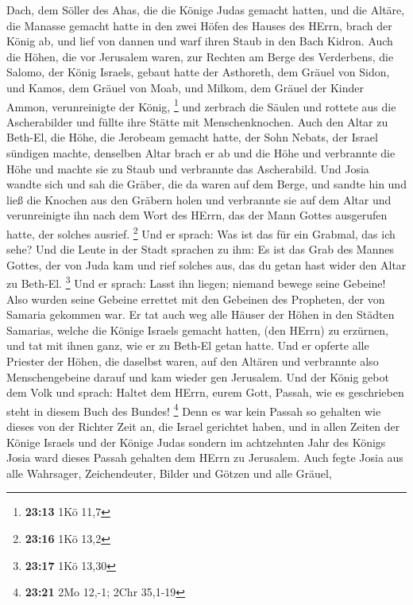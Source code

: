 Dach, dem Söller des Ahas, die die Könige Judas gemacht hatten, und die
Altäre, die Manasse gemacht hatte in den zwei Höfen des Hauses des
HErrn, brach der König ab, und lief von dannen und warf ihren Staub in
den Bach Kidron.  Auch die Höhen, die vor Jerusalem waren,
zur Rechten am Berge des Verderbens, die Salomo, der König Israels,
gebaut hatte der Asthoreth, dem Gräuel von Sidon, und Kamos, dem Gräuel
von Moab, und Milkom, dem Gräuel der Kinder Ammon, verunreinigte der
König, \footnote{\textbf{23:13} 1Kö 11,7}  und zerbrach die
Säulen und rottete aus die Ascherabilder und füllte ihre Stätte mit
Menschenknochen.  Auch den Altar zu Beth-El, die Höhe, die
Jerobeam gemacht hatte, der Sohn Nebats, der Israel sündigen machte,
denselben Altar brach er ab und die Höhe und verbrannte die Höhe und
machte sie zu Staub und verbrannte das Ascherabild.  Und
Josia wandte sich und sah die Gräber, die da waren auf dem Berge, und
sandte hin und ließ die Knochen aus den Gräbern holen und verbrannte sie
auf dem Altar und verunreinigte ihn nach dem Wort des HErrn, das der
Mann Gottes ausgerufen hatte, der solches ausrief. \footnote{\textbf{23:16}
  1Kö 13,2}  Und er sprach: Was ist das für ein Grabmal,
das ich sehe? Und die Leute in der Stadt sprachen zu ihm: Es ist das
Grab des Mannes Gottes, der von Juda kam und rief solches aus, das du
getan hast wider den Altar zu Beth-El. \footnote{\textbf{23:17} 1Kö
  13,30}  Und er sprach: Lasst ihn liegen; niemand bewege
seine Gebeine! Also wurden seine Gebeine errettet mit den Gebeinen des
Propheten, der von Samaria gekommen war.  Er tat auch weg
alle Häuser der Höhen in den Städten Samarias, welche die Könige Israels
gemacht hatten, (den HErrn) zu erzürnen, und tat mit ihnen ganz, wie er
zu Beth-El getan hatte.  Und er opferte alle Priester der
Höhen, die daselbst waren, auf den Altären und verbrannte also
Menschengebeine darauf und kam wieder gen Jerusalem.  Und
der König gebot dem Volk und sprach: Haltet dem HErrn, eurem Gott,
Passah, wie es geschrieben steht in diesem Buch des Bundes! \footnote{\textbf{23:21}
  2Mo 12,-1; 2Chr 35,1-19}  Denn es war kein Passah so
gehalten wie dieses von der Richter Zeit an, die Israel gerichtet haben,
und in allen Zeiten der Könige Israels und der Könige Judas
 sondern im achtzehnten Jahr des Königs Josia ward dieses
Passah gehalten dem HErrn zu Jerusalem.  Auch fegte Josia
aus alle Wahrsager, Zeichendeuter, Bilder und Götzen und alle Gräuel,
